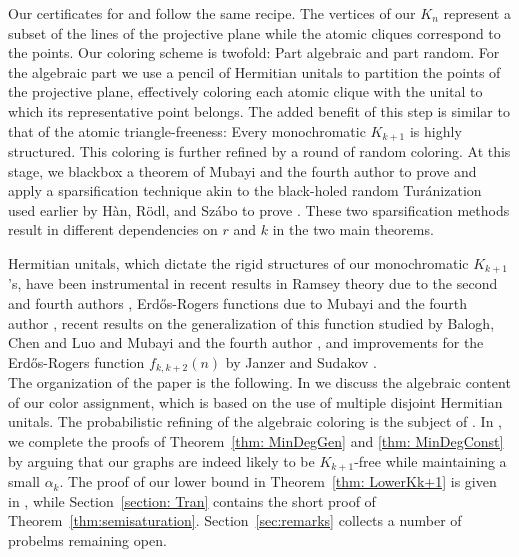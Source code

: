 \documentclass[12pt]{article}
\theoremstyle{definition}
\begin{document}
	Our certificates for  and  follow the same recipe. The vertices of our $K_n$ represent a subset of the lines of the projective plane while the atomic cliques correspond to the points. Our coloring scheme is twofold: Part algebraic and part random. For the algebraic part we use a pencil of Hermitian unitals to partition the points of the projective plane, effectively coloring each atomic clique with the unital to which its representative point belongs. The added benefit of this step is similar to that of the atomic triangle-freeness: Every monochromatic $K_{k+1}$ is highly structured. This coloring is further refined by a round of random coloring. At this stage, we blackbox a theorem of Mubayi and the fourth author \cite{mubayi2024order} to prove  and apply a sparsification technique akin to the black-holed random Turánization used earlier by Hàn, Rödl, and Szábo to prove . These two sparsification methods result in different dependencies on $r$ and $k$ in the two main theorems.\\
	\fi
	
    
    Hermitian unitals, which dictate the rigid structures of our monochromatic $K_{k+1}$'s, have been instrumental in recent results in Ramsey theory due to the second and fourth authors \cite{mattheus2024asymptotics}, Erd\H{o}s-Rogers functions due to Mubayi and the fourth author \cite{mubayi2024order}, recent results on the generalization of this function studied by Balogh, Chen and Luo \cite{balogh2025maximum} and Mubayi and the fourth author \cite{mubayi2024erd}, and improvements for the Erd\H{o}s-Rogers function $f_{k,k+2}(n)$ by Janzer and Sudakov \cite{janzer2025improved}. \\
	
    The organization of the paper is the following. In  we discuss the algebraic content of our color assignment, which is based on the use of multiple disjoint Hermitian unitals. 
	The probabilistic refining of the algebraic coloring is the subject of . In , we complete the proofs of Theorem~\ref{thm: MinDegGen} and \ref{thm: MinDegConst} by arguing that our graphs are indeed likely to be $K_{k+1}$-free while maintaining a small $\alpha_k$. The proof of our lower bound in Theorem~\ref{thm: LowerKk+1} is given in , while Section~\ref{section: Tran} contains the short proof of Theorem~\ref{thm:semisaturation}. Section~\ref{sec:remarks} collects a number of probelms remaining open.
    
\end{document}
